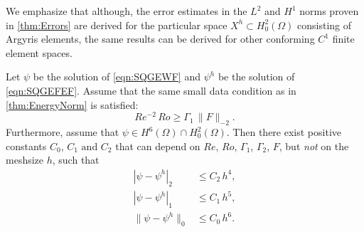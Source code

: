 We emphasize that although, the error estimates in the $L^2$ and $H^1$ norms
proven in \autoref{thm:Errors} are derived for the particular space $X^h\subset
H^2_0(\Omega)$ consisting of Argyris elements, the same results can be derived
for other conforming $C^1$ finite element spaces.
\begin{thm} \label{thm:Errors}
  Let $\psi$ be the solution of \eqref{eqn:SQGEWF} and $\psi^h$ be the solution
  of \eqref{eqn:SQGEFEF}.  Assume that the same small data condition as in
  \autoref{thm:EnergyNorm} is satisfied:
  \begin{equation}
    Re^{-2} \, Ro \geq \Gamma_1 \, \| F \|_{-2} .
    \label{eqn:small_data_condition_dual}
  \end{equation}
  Furthermore, assume that $\psi\in H^6(\Omega) \cap H^2_0(\Omega)$.  Then there
  exist positive constants $C_0, \, C_1 \text{ and } C_2$ that can depend on
  $Re$, $Ro$, $\Gamma_1$, $\Gamma_2$, $F$, but \emph{not} on the meshsize $h$, such that
  \begin{align}
    |\psi - \psi^h|_2 &\le C_2 \, h^4 , \label{eqn:H2Error} \\
    |\psi - \psi^h|_1 &\le C_1 \, h^5 , \label{eqn:H1Error} \\
    \|\psi - \psi^h\|_0 &\le C_0 \, h^6 . \label{eqn:L2Error}
  \end{align}
\end{thm}
